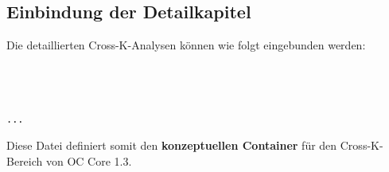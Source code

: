 \subsection{Einbindung der Detailkapitel}
\noindent Die detaillierten Cross-K-Analysen können wie folgt eingebunden werden:
\begin{verbatim}



...

\end{verbatim}

\noindent Diese Datei definiert somit den \textbf{konzeptuellen Container} für den
Cross-K-Bereich von OC Core 1.3.
